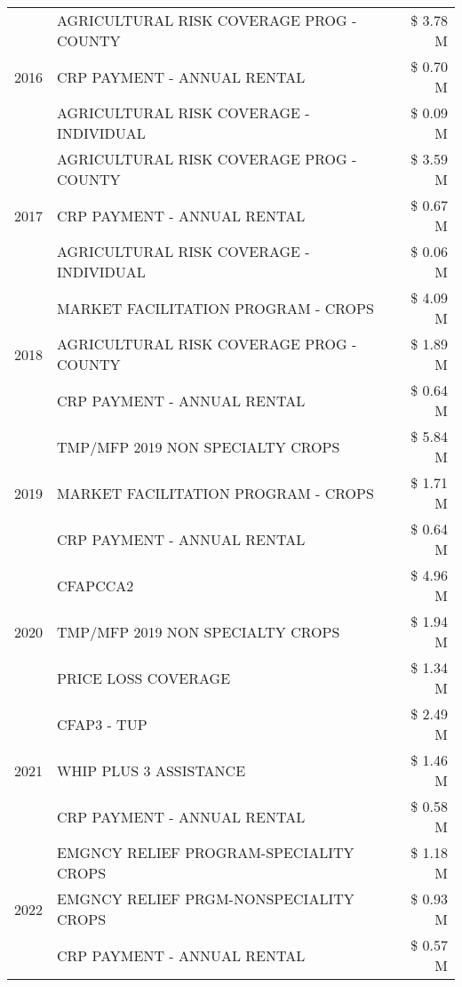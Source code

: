 \begin{tabular}{llr}
\cline{1-3}
\multirow[t]{3}{*}{2016} & AGRICULTURAL RISK COVERAGE PROG - COUNTY & \$ 3.78 M \\
 & CRP PAYMENT - ANNUAL RENTAL & \$ 0.70 M \\
 & AGRICULTURAL RISK COVERAGE - INDIVIDUAL & \$ 0.09 M \\
\cline{1-3}
\multirow[t]{3}{*}{2017} & AGRICULTURAL RISK COVERAGE PROG - COUNTY & \$ 3.59 M \\
 & CRP PAYMENT - ANNUAL RENTAL & \$ 0.67 M \\
 & AGRICULTURAL RISK COVERAGE - INDIVIDUAL & \$ 0.06 M \\
\cline{1-3}
\multirow[t]{3}{*}{2018} & MARKET FACILITATION PROGRAM - CROPS & \$ 4.09 M \\
 & AGRICULTURAL RISK COVERAGE PROG - COUNTY & \$ 1.89 M \\
 & CRP PAYMENT - ANNUAL RENTAL & \$ 0.64 M \\
\cline{1-3}
\multirow[t]{3}{*}{2019} & TMP/MFP 2019 NON SPECIALTY CROPS & \$ 5.84 M \\
 & MARKET FACILITATION PROGRAM - CROPS & \$ 1.71 M \\
 & CRP PAYMENT - ANNUAL RENTAL & \$ 0.64 M \\
\cline{1-3}
\multirow[t]{3}{*}{2020} & CFAPCCA2 & \$ 4.96 M \\
 & TMP/MFP 2019 NON SPECIALTY CROPS & \$ 1.94 M \\
 & PRICE LOSS COVERAGE & \$ 1.34 M \\
\cline{1-3}
\multirow[t]{3}{*}{2021} & CFAP3 - TUP & \$ 2.49 M \\
 & WHIP PLUS 3 ASSISTANCE & \$ 1.46 M \\
 & CRP PAYMENT - ANNUAL RENTAL & \$ 0.58 M \\
\cline{1-3}
\multirow[t]{3}{*}{2022} & EMGNCY RELIEF PROGRAM-SPECIALITY CROPS & \$ 1.18 M \\
 & EMGNCY RELIEF PRGM-NONSPECIALITY CROPS & \$ 0.93 M \\
 & CRP PAYMENT - ANNUAL RENTAL & \$ 0.57 M \\
\cline{1-3}
\bottomrule
\end{tabular}
